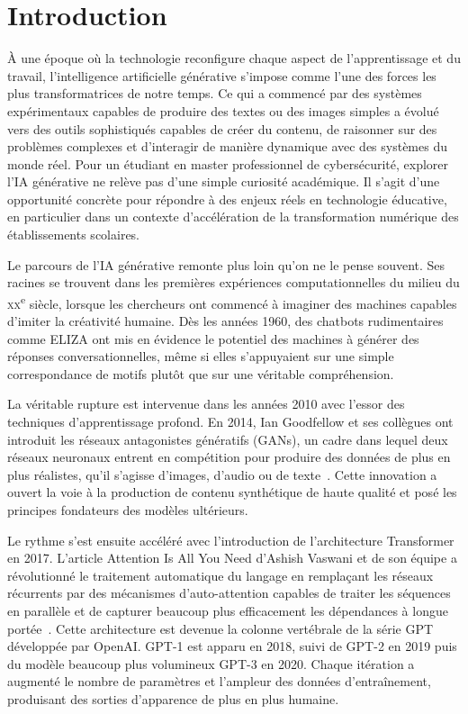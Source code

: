 \chapter*{Introduction}

À une époque où la technologie reconfigure chaque aspect de l'apprentissage
et du travail, l'intelligence artificielle générative s'impose comme l'une des
forces les plus transformatrices de notre temps. Ce qui a commencé par des
systèmes expérimentaux capables de produire des textes ou des images simples a
évolué vers des outils sophistiqués capables de créer du contenu, de raisonner
sur des problèmes complexes et d'interagir de manière dynamique avec des systèmes
du monde réel. Pour un étudiant en master professionnel de cybersécurité, explorer
l'IA générative ne relève pas d'une simple curiosité académique. Il s'agit d'une
opportunité concrète pour répondre à des enjeux réels en technologie éducative,
en particulier dans un contexte d'accélération de la transformation numérique des
établissements scolaires.

Le parcours de l'IA générative remonte plus loin qu'on ne le pense souvent. Ses
racines se trouvent dans les premières expériences computationnelles du milieu du
\textsc{xx}\textsuperscript{e} siècle, lorsque les chercheurs ont commencé à imaginer
des machines capables d'imiter la créativité humaine. Dès les années 1960, des
chatbots rudimentaires comme ELIZA ont mis en évidence le potentiel des machines
à générer des réponses conversationnelles, même si elles s'appuyaient sur une
simple correspondance de motifs plutôt que sur une véritable compréhension.

La véritable rupture est intervenue dans les années 2010 avec l'essor des techniques
d'apprentissage profond. En 2014, Ian Goodfellow et ses collègues ont introduit les
réseaux antagonistes génératifs (GANs), un cadre dans lequel deux réseaux neuronaux
entrent en compétition pour produire des données de plus en plus réalistes,
qu'il s'agisse d'images, d'audio ou de texte~\cite{goodfellow2014}. Cette innovation
a ouvert la voie à la production de contenu synthétique de haute qualité et posé les
principes fondateurs des modèles ultérieurs.

Le rythme s'est ensuite accéléré avec l'introduction de l'architecture Transformer
en 2017. L'article \og{}Attention Is All You Need\fg{} d'Ashish Vaswani et de son
équipe a révolutionné le traitement automatique du langage en remplaçant les réseaux
récurrents par des mécanismes d'auto-attention capables de traiter les séquences en
parallèle et de capturer beaucoup plus efficacement les dépendances à longue
portée~\cite{vaswani2017}. Cette architecture est devenue la colonne vertébrale de
la série GPT développée par OpenAI. GPT-1 est apparu en 2018, suivi de GPT-2 en 2019
puis du modèle beaucoup plus volumineux GPT-3 en 2020. Chaque itération a augmenté le
nombre de paramètres et l'ampleur des données d'entraînement, produisant des sorties
d'apparence de plus en plus humaine.

